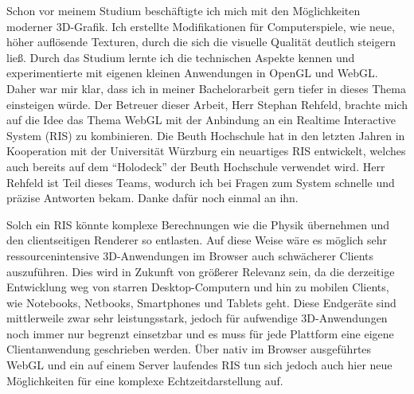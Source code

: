 \label{chap:vorwort}
Schon vor meinem Studium beschäftigte ich mich mit den Möglichkeiten moderner 3D-Grafik. Ich erstellte Modifikationen für Computerspiele, wie neue, höher auflösende Texturen, durch die sich die visuelle Qualität deutlich steigern ließ. Durch das Studium lernte ich die technischen Aspekte kennen und experimentierte mit eigenen kleinen Anwendungen in OpenGL und WebGL. Daher war mir klar, dass ich in meiner Bachelorarbeit gern tiefer in dieses Thema einsteigen würde. Der Betreuer dieser Arbeit, Herr Stephan Rehfeld, brachte mich auf die Idee das Thema WebGL mit der Anbindung an ein Realtime Interactive System (RIS) zu kombinieren. Die Beuth Hochschule hat in den letzten Jahren in Kooperation mit der Universität Würzburg ein neuartiges RIS entwickelt, welches auch bereits auf dem "`Holodeck"' der Beuth Hochschule verwendet wird. Herr Rehfeld ist Teil dieses Teams, wodurch ich bei Fragen zum System schnelle und präzise Antworten bekam. Danke dafür noch einmal an ihn.

Solch ein RIS könnte komplexe Berechnungen wie die Physik übernehmen und den clientseitigen Renderer so entlasten. Auf diese Weise wäre es möglich sehr ressourcenintensive 3D-Anwendungen im Browser auch schwächerer Clients auszuführen. Dies wird in Zukunft von größerer Relevanz sein, da die derzeitige Entwicklung weg von starren Desktop-Computern und hin zu mobilen Clients, wie Notebooks, Netbooks, Smartphones und Tablets geht. Diese Endgeräte sind mittlerweile zwar sehr leistungsstark, jedoch für aufwendige 3D-Anwendungen noch immer nur begrenzt einsetzbar und es muss für jede Plattform eine eigene Clientanwendung geschrieben werden. Über nativ im Browser ausgeführtes WebGL und ein auf einem Server laufendes RIS tun sich jedoch auch hier neue Möglichkeiten für eine komplexe Echtzeitdarstellung auf.

